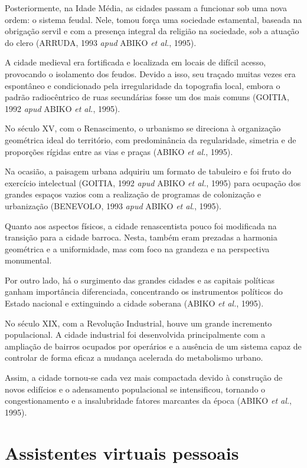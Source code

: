 Posteriormente, na Idade Média, as cidades passam a funcionar sob uma nova ordem: o sistema feudal. Nele, tomou força uma sociedade estamental, baseada na obrigação servil e com a presença integral da religião na sociedade, sob a atuação do clero (ARRUDA, 1993 \textit{apud} ABIKO \textit{et al.}, 1995).

A cidade medieval era fortificada e localizada em locais de difícil acesso, provocando o isolamento dos feudos. Devido a
isso, seu traçado muitas vezes era espontâneo e condicionado pela irregularidade da topografia local, embora o padrão radiocêntrico de ruas secundárias fosse um dos mais comuns (GOITIA, 1992 \textit{apud} ABIKO \textit{et al.}, 1995).

No século XV, com o Renascimento, o urbanismo se direciona à organização geométrica ideal do território, com predominância da regularidade, simetria e de proporções rígidas entre as vias e praças (ABIKO \textit{et al.}, 1995).

Na ocasião, a paisagem urbana adquiriu um formato de tabuleiro e foi fruto do exercício intelectual (GOITIA, 1992 \textit{apud} ABIKO \textit{et al.}, 1995) para ocupação dos grandes espaços vazios com a realização de programas de colonização e urbanização (BENEVOLO, 1993 \textit{apud} ABIKO \textit{et al}., 1995).

Quanto aos aspectos físicos, a cidade renascentista pouco foi modificada na transição para a cidade barroca. Nesta, também eram prezadas a harmonia geométrica e a uniformidade, mas com foco na grandeza e na perspectiva monumental.

Por outro lado, há o surgimento das grandes cidades e as capitais políticas ganham importância
diferenciada, concentrando os instrumentos políticos do Estado nacional e extinguindo a cidade soberana (ABIKO \textit{et al.}, 1995).

No século XIX, com a Revolução Industrial, houve um grande incremento populacional. A cidade industrial foi desenvolvida principalmente com a ampliação de bairros ocupados por operários e a ausência de um sistema capaz de controlar de forma eficaz a mudança acelerada do metabolismo urbano.

Assim, a cidade tornou-se cada vez mais compactada devido à construção de novos edifícios e o adensamento populacional
se intensificou, tornando o congestionamento e a insalubridade fatores marcantes da época (ABIKO \textit{et al.}, 1995).

\section{Assistentes virtuais pessoais} \label{s:assistentes_virtuais_pessoais}

